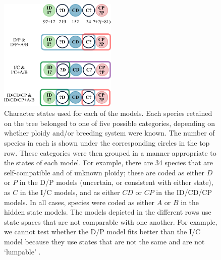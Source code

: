 \begin{figure}
\centering
\includegraphics[width=0.5\textwidth]{states.pdf}
\caption{
Character states used for each of the models.
Each species retained on the tree belonged to one of five possible categories, depending on whether ploidy and/or breeding system were known.
The number of species in each is shown under the corresponding circles in the top row. %
These categories were then grouped in a manner appropriate to the states of each model.
For example, there are 34 species that are self-compatible and of unknown ploidy; these are coded as either $D$ or $P$ in the D/P models (uncertain, or consistent with either state), as $C$ in the I/C models, and as either $CD$ or $CP$ in the ID/CD/CP models.
In all cases, species were coded as either $A$ or $B$ in the hidden state models.
The models depicted in the different rows use state spaces that are not comparable with one another.
For example, we cannot test whether the D/P model fits better than the I/C model because they use states that are not the same and are not `lumpable' \citep{tarasov_2019}.
}
\label{figure:stateclassifications}
\end{figure}

